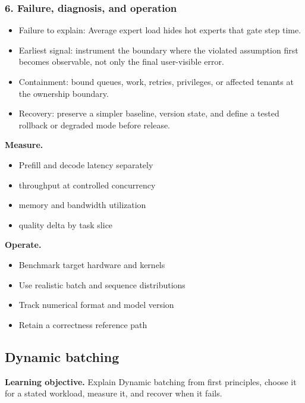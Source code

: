 \subsubsection*{6. Failure, diagnosis, and operation}
\begin{itemize}
\item Failure to explain: Average expert load hides hot experts that gate step time.
\item Earliest signal: instrument the boundary where the violated assumption first becomes observable, not only the final user-visible error.
\item Containment: bound queues, work, retries, privileges, or affected tenants at the ownership boundary.
\item Recovery: preserve a simpler baseline, version state, and define a tested rollback or degraded mode before release.
\end{itemize}
\textbf{Measure.}\begin{itemize}
\item Prefill and decode latency separately
\item throughput at controlled concurrency
\item memory and bandwidth utilization
\item quality delta by task slice
\end{itemize}
\textbf{Operate.}\begin{itemize}
\item Benchmark target hardware and kernels
\item Use realistic batch and sequence distributions
\item Track numerical format and model version
\item Retain a correctness reference path
\end{itemize}
\subsection{Dynamic batching}
\textbf{Learning objective.} Explain Dynamic batching from first principles, choose it for a stated workload, measure it, and recover when it fails.
